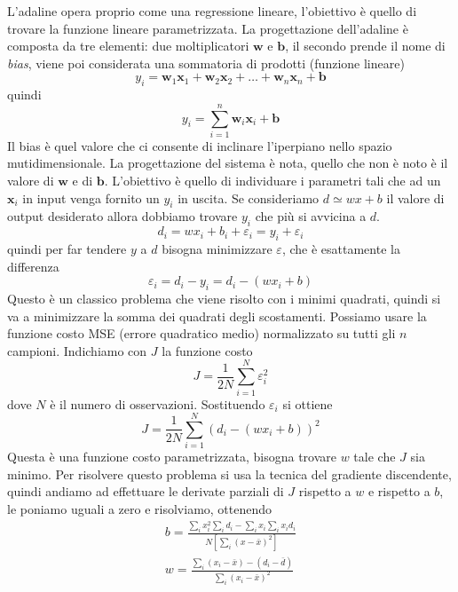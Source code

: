 L'adaline opera proprio come una regressione lineare, l'obiettivo è quello di trovare la funzione lineare parametrizzata. La progettazione dell'adaline è composta da tre elementi: due moltiplicatori $\mathbf{w}$ e $\mathbf{b}$, il secondo prende il nome di \emph{bias}, viene poi considerata una sommatoria di prodotti (funzione lineare)
\begin{equation}
y_i =  \mathbf{w}_1\mathbf{x}_1 + \mathbf{w}_2 \mathbf{x}_2 + \dots + \mathbf{w}_n \mathbf{x}_n + \mathbf{b} 
\end{equation}
quindi
\begin{equation}
y_i = \sum_{i=1}^n \mathbf{w}_i \mathbf{x}_i + \mathbf{b}
\end{equation}
Il bias è quel valore che ci consente di inclinare l'iperpiano nello spazio mutidimensionale. La progettazione del sistema è nota, quello che non è noto è il valore di $\mathbf{w}$ e di $\mathbf{b}$. L'obiettivo è quello di individuare i parametri tali che ad un $\mathbf{x}_i$ in input venga fornito un $y_i$ in uscita. Se consideriamo $d \simeq wx + b$ il valore di output desiderato allora dobbiamo trovare $y_i$ che più si avvicina a $d$. 
\begin{equation}
d_i = wx_i + b_i + \varepsilon_i = y_i + \varepsilon_i
\end{equation}
quindi per far tendere $y$ a $d$ bisogna minimizzare $\varepsilon$, che è esattamente la differenza
\begin{equation}
\varepsilon_i = d_i - y_i = d_i - (wx_i + b)
\end{equation}
Questo è un classico problema che viene risolto con i minimi quadrati, quindi si va a minimizzare la somma dei quadrati degli scostamenti. Possiamo usare la funzione costo MSE (errore quadratico medio) normalizzato su tutti gli $n$ campioni. Indichiamo con $J$ la funzione costo
\begin{equation}
J = \frac{1}{2N} \sum_{i=1}^N \varepsilon_i^2
\end{equation}
dove $N$ è il numero di osservazioni. Sostituendo $\varepsilon_i$ si ottiene
\begin{equation}
J = \frac{1}{2N} \sum_{i=1}^N (d_i - (wx_i + b))^2
\end{equation}
Questa è una funzione costo parametrizzata, bisogna trovare $w$ tale che $J$ sia minimo. Per risolvere questo problema si usa la tecnica del gradiente discendente, quindi andiamo ad effettuare le derivate parziali di $J$ rispetto a $w$ e rispetto a $b$, le poniamo uguali a zero e risolviamo,  ottenendo 
\begin{gather}
b= \frac{\sum_i x_i^2 \sum_i d_i - \sum_i x_i \sum_i x_i d_i}{N \left[ \sum_i (x - \bar{x})^2 \right]}\\
w = \frac{\sum_i (x_i - \bar{x}) - (d_i - \bar{d})}{\sum_i (x_i - \bar{x})^2}
\end{gather}
